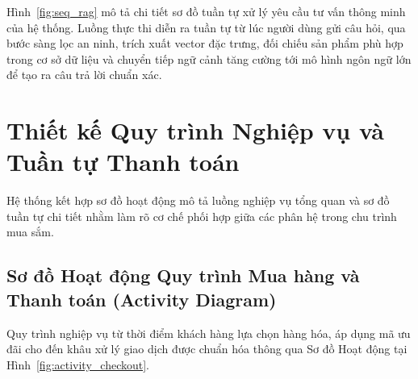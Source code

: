 Hình~\ref{fig:seq_rag} mô tả chi tiết sơ đồ tuần tự xử lý yêu cầu tư vấn thông minh của hệ thống. Luồng thực thi diễn ra tuần tự từ lúc người dùng gửi câu hỏi, qua bước sàng lọc an ninh, trích xuất vector đặc trưng, đối chiếu sản phẩm phù hợp trong cơ sở dữ liệu và chuyển tiếp ngữ cảnh tăng cường tới mô hình ngôn ngữ lớn để tạo ra câu trả lời chuẩn xác.

\section{Thiết kế Quy trình Nghiệp vụ và Tuần tự Thanh toán}
Hệ thống kết hợp sơ đồ hoạt động mô tả luồng nghiệp vụ tổng quan và sơ đồ tuần tự chi tiết nhằm làm rõ cơ chế phối hợp giữa các phân hệ trong chu trình mua sắm.

\subsection{Sơ đồ Hoạt động Quy trình Mua hàng và Thanh toán (Activity Diagram)}
Quy trình nghiệp vụ từ thời điểm khách hàng lựa chọn hàng hóa, áp dụng mã ưu đãi cho đến khâu xử lý giao dịch được chuẩn hóa thông qua Sơ đồ Hoạt động tại Hình~\ref{fig:activity_checkout}.


